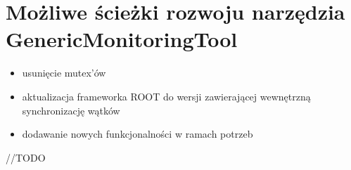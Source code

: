 \section{Możliwe ścieżki rozwoju narzędzia GenericMonitoringTool}
\begin{itemize}
\item usunięcie mutex'ów
\item aktualizacja frameworka ROOT do wersji zawierającej wewnętrzną synchronizację wątków
\item dodawanie nowych funkcjonalności w ramach potrzeb
\end{itemize}

//TODO